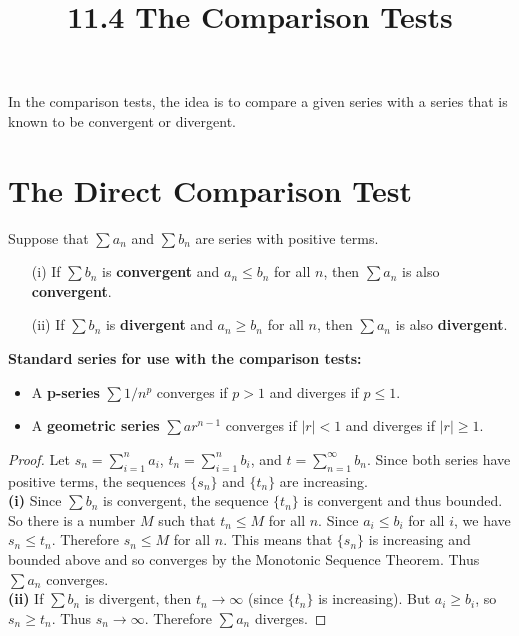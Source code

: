 \documentclass{article}
\title{11.4 The Comparison Tests}
\date{}
\author{}
\theoremstyle{mystyle}
\begin{document}
\maketitle

In the comparison tests, the idea is to compare a given series with a series that is known to be convergent or divergent.

\section*{The Direct Comparison Test}

\begin{tcolorbox}[
    colback=white,
    colframe=orange!80!white,
    title=The Direct Comparison Test,
    boxrule=0.5mm,
    arc=3mm
    ]
    Suppose that \( \sum a_n \) and \( \sum b_n \) are series with positive terms.
    \begin{itemize}
        \item[(i)] If \( \sum b_n \) is \textbf{convergent} and \( a_n \le b_n \) for all \( n \), then \( \sum a_n \) is also \textbf{convergent}.
        \item[(ii)] If \( \sum b_n \) is \textbf{divergent} and \( a_n \ge b_n \) for all \( n \), then \( \sum a_n \) is also \textbf{divergent}.
    \end{itemize}
    \textbf{Standard series for use with the comparison tests:}
    \begin{itemize}
        \item A \textbf{p-series} \( \sum 1/n^p \) converges if \( p > 1 \) and diverges if \( p \le 1 \).
        \item A \textbf{geometric series} \( \sum ar^{n-1} \) converges if \( |r| < 1 \) and diverges if \( |r| \ge 1 \).
    \end{itemize}
\end{tcolorbox}

\begin{proof}
  Let \(s_n = \sum_{i=1}^n a_i\), \(t_n = \sum_{i=1}^n b_i\), and \(t = \sum_{n=1}^\infty b_n\). Since both series have positive terms, the sequences \(\{s_n\}\) and \(\{t_n\}\) are increasing.\\
  \textbf{(i)} Since \( \sum b_n \) is convergent, the sequence \(\{t_n\}\) is convergent and thus bounded. So there is a number \(M\) such that \(t_n \le M\) for all \(n\). Since \(a_i \le b_i\) for all \(i\), we have \(s_n \le t_n\). Therefore \(s_n \le M\) for all \(n\). This means that \(\{s_n\}\) is increasing and bounded above and so converges by the Monotonic Sequence Theorem. Thus \( \sum a_n \) converges.\\
  \textbf{(ii)} If \( \sum b_n \) is divergent, then \(t_n \to \infty\) (since \(\{t_n\}\) is increasing). But \(a_i \ge b_i\), so \(s_n \ge t_n\). Thus \(s_n \to \infty\). Therefore \( \sum a_n \) diverges.
  \end{proof}
\end{document}
